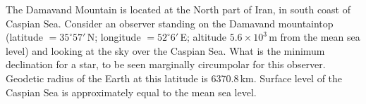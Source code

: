 The Damavand Mountain is located at the North part of Iran, in south coast of
Caspian Sea. Consider an observer standing on the Damavand mountaintop
(latitude $= 35^\circ 57'$\,N; longitude $= 52^\circ 6'$\,E; altitude
$5.6 \times 10^{3}$\,m from the mean sea level) and looking at the sky over
the Caspian Sea. What is the minimum declination for a star, to be seen
marginally circumpolar for this observer. Geodetic radius of the Earth at this
latitude is 6370.8\,km. Surface level of the Caspian Sea is approximately
equal to the mean sea level.
